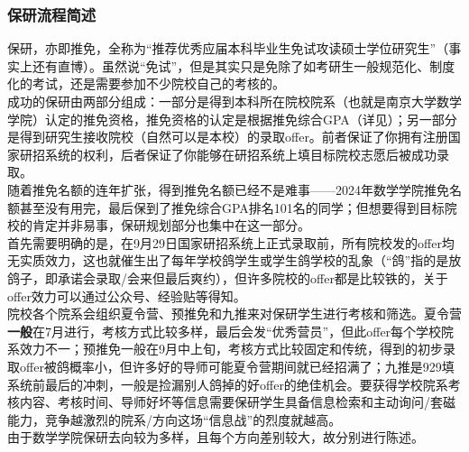 \documentclass[a4paper,11pt,notitlepage]{article}
\newcommand{\empha}[1]{\textbf{#1}}
\begin{document}
\subsubsection{保研流程简述}
保研，亦即推免，全称为“推荐优秀应届本科毕业生免试攻读硕士学位研究生”（事实上还有直博）。虽然说“免试”，但是其实只是免除了如考研生一般规范化、制度化的考试，还是需要参加不少院校自己的考核的。\\
\indent 成功的保研由两部分组成：一部分是得到本科所在院校院系（也就是南京大学数学学院）认定的推免资格，推免资格的认定是根据推免综合GPA（详见）；另一部分是得到研究生接收院校（自然可以是本校）的录取offer。前者保证了你拥有注册国家研招系统的权利，后者保证了你能够在研招系统上填目标院校志愿后被成功录取。\\
\indent 随着推免名额的连年扩张，得到推免名额已经不是难事——2024年数学学院推免名额甚至没有用完，最后保到了推免综合GPA排名101名的同学；但想要得到目标院校的肯定并非易事，保研规划部分也集中在这一部分。\\
\indent 首先需要明确的是，在9月29日国家研招系统上正式录取前，所有院校发的offer均无实质效力，这也就催生出了每年学校鸽学生或学生鸽学校的乱象（“鸽”指的是放鸽子，即承诺会录取/会来但最后爽约），但许多院校的offer都是比较铁的，关于offer效力可以通过公众号、经验贴等得知。\\
\indent 院校各个院系会组织夏令营、预推免和九推来对保研学生进行考核和筛选。夏令营\empha{一般}在7月进行，考核方式比较多样，最后会发“优秀营员”，但此offer每个学校院系效力不一；预推免一般在9月中上旬，考核方式比较固定和传统，得到的初步录取offer被鸽概率小，但许多好的导师可能夏令营期间就已经招满了；九推是929填系统前最后的冲刺，一般是捡漏别人鸽掉的好offer的绝佳机会。要获得学校院系考核内容、考核时间、导师好坏等信息需要保研学生具备信息检索和主动询问/套磁能力，竞争越激烈的院系/方向这场“信息战”的烈度就越高。\\
\indent 由于数学学院保研去向较为多样，且每个方向差别较大，故分别进行陈述。
\end{document}
